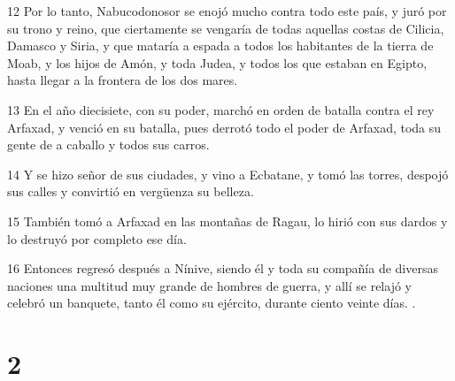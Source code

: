 \par 12 Por lo tanto, Nabucodonosor se enojó mucho contra todo este país, y juró por su trono y reino, que ciertamente se vengaría de todas aquellas costas de Cilicia, Damasco y Siria, y que mataría a espada a todos los habitantes de la tierra de Moab, y los hijos de Amón, y toda Judea, y todos los que estaban en Egipto, hasta llegar a la frontera de los dos mares.
\par 13 En el año diecisiete, con su poder, marchó en orden de batalla contra el rey Arfaxad, y venció en su batalla, pues derrotó todo el poder de Arfaxad, toda su gente de a caballo y todos sus carros.
\par 14 Y se hizo señor de sus ciudades, y vino a Ecbatane, y tomó las torres, despojó sus calles y convirtió en vergüenza su belleza.
\par 15 También tomó a Arfaxad en las montañas de Ragau, lo hirió con sus dardos y lo destruyó por completo ese día.
\par 16 Entonces regresó después a Nínive, siendo él y toda su compañía de diversas naciones una multitud muy grande de hombres de guerra, y allí se relajó y celebró un banquete, tanto él como su ejército, durante ciento veinte días. .

\chapter{2}

